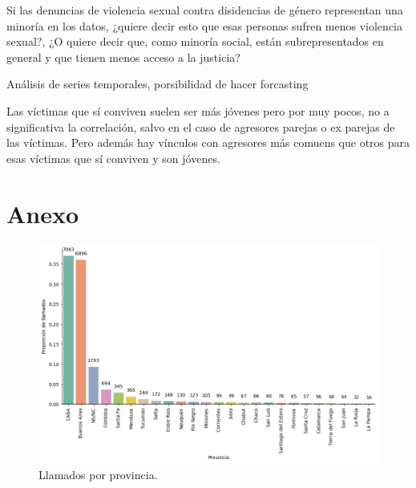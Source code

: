 \documentclass[10 pt]{article}
\begin{document}
Si las denuncias de violencia sexual contra disidencias de género representan una minoría en los datos, ¿quiere decir esto que esas personas sufren menos violencia sexual?, ¿O quiere decir que, como minoría social, están subrepresentados en general y que tienen menos acceso a la justicia?



Análisis de series temporales, porsibilidad de hacer forcasting

Las víctimas que sí conviven suelen ser más jóvenes pero por muy pocos, no a significativa la correlación, salvo en el caso de agresores parejas o ex parejas de las víctimas. Pero además hay vínculos con agresores más comuens que otros para esas víctimas que sí conviven y son jóvenes.
\newpage




\newpage
\section{Anexo}\label{anex}




\begin{figure}[H]
\begin{center}
\includegraphics[scale=.5]{images/latex_llamados_por_provincia.png}
\caption{Llamados por provincia.}
\label{provincia}
\end{center}
\end{figure}
\end{document}
